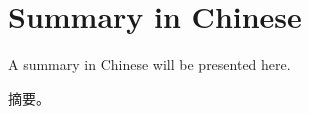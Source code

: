 \chapter*{Summary in Chinese}
\begin{CJK*}{UTF8}{gbsn}
A summary in Chinese will be presented here.

摘要。
\end{CJK*}



